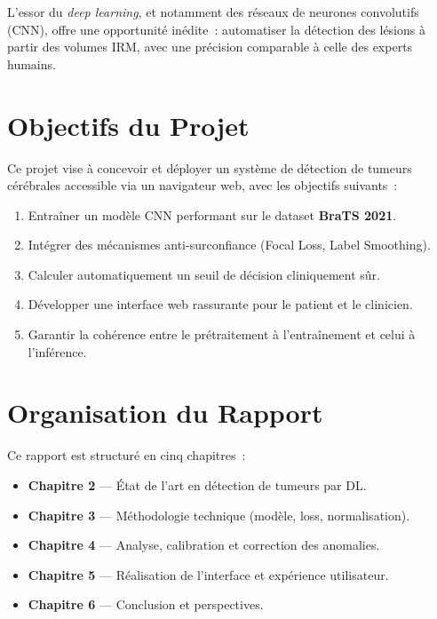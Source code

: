 \documentclass[12pt, a4paper]{report}
\begin{document}
L'essor du \textit{deep learning}, et notamment des réseaux de neurones
convolutifs (CNN), offre une opportunité inédite~: automatiser la
détection des lésions à partir des volumes IRM, avec une précision
comparable à celle des experts humains.

\section{Objectifs du Projet}

Ce projet vise à concevoir et déployer un système de détection de
tumeurs cérébrales accessible via un navigateur web, avec les objectifs
suivants~:

\begin{enumerate}[leftmargin=*, label=\arabic*.]
  \item Entraîner un modèle CNN performant sur le dataset \textbf{BraTS 2021}.
  \item Intégrer des mécanismes anti-surconfiance (Focal Loss, Label Smoothing).
  \item Calculer automatiquement un seuil de décision cliniquement sûr.
  \item Développer une interface web rassurante pour le patient et le clinicien.
  \item Garantir la cohérence entre le prétraitement à l'entraînement et
        celui à l'inférence.
\end{enumerate}

\section{Organisation du Rapport}

Ce rapport est structuré en cinq chapitres~:
\begin{itemize}
  \item \textbf{Chapitre 2} — État de l'art en détection de tumeurs par DL.
  \item \textbf{Chapitre 3} — Méthodologie technique (modèle, loss, normalisation).
  \item \textbf{Chapitre 4} — Analyse, calibration et correction des anomalies.
  \item \textbf{Chapitre 5} — Réalisation de l'interface et expérience utilisateur.
  \item \textbf{Chapitre 6} — Conclusion et perspectives.
\end{itemize}

\end{document}
